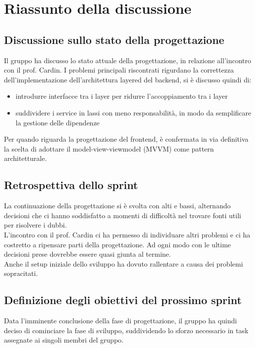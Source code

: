 \documentclass[a4paper, 11pt]{article}
\begin{document}
\section{Riassunto della discussione}

\subsection{Discussione sullo stato della progettazione}
Il gruppo ha discusso lo stato attuale della progettazione, in relazione all'incontro con il prof. Cardin. I problemi principali riscontrati rigurdano la correttezza dell'implementazione dell'architettura layered del backend, si è discusso quindi di:
\begin{itemize}
    \item introdurre interfacce tra i layer per ridurre l'accoppiamento tra i layer
    \item suddividere i service in lassi con meno responsabilità, in modo da semplificare la gestione delle dipendenze
\end{itemize}
Per quando riguarda la progettazione del frontend, è confermata in via definitiva la scelta di adottare il model-view-viewmodel (MVVM) come pattern architetturale.

\subsection{Retrospettiva dello sprint}
La continuazione della progettazione si è svolta con alti e bassi, alternando decisioni che ci hanno soddisfatto a momenti di difficoltà nel trovare fonti utili per risolvere i dubbi.\\ L'incontro con il prof. Cardin ci ha permesso di individuare altri problemi e ci ha costretto a ripensare parti della progettazione. Ad ogni modo con le ultime decisioni prese dovrebbe essere quasi giunta al termine. \\Anche il setup iniziale dello sviluppo ha dovuto rallentare a causa dei problemi sopracitati.

\subsection{Definizione degli obiettivi del prossimo sprint}
Data l'imminente conclusione della fase di progettazione, il gruppo ha quindi deciso di cominciare la fase di sviluppo, suddividendo lo sforzo necessario in task assegnate ai singoli membri del gruppo. 
\end{document}

